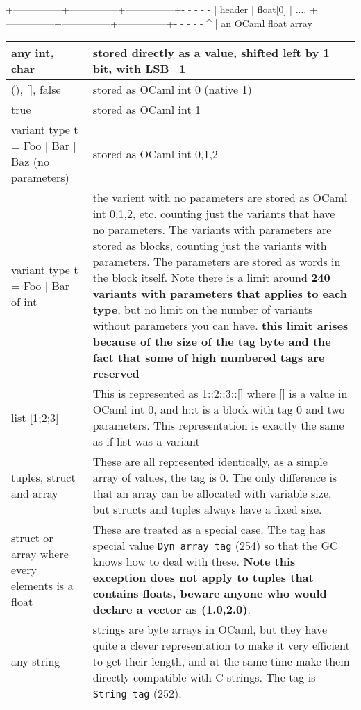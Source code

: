 \begin{enumerate}
\begin{bluetext}
+---------------+---------------+---------------+- - - - -
| header        | float[0]                      | ....
+---------------+---------------+---------------+- - - - -
                  ^
                  |
              an OCaml float array

\end{bluetext}

  \begin{tabular}{|p{3cm}|p{12cm}|}
    \hline 
    any int, char & stored directly as a value, shifted left by 1 bit, with LSB=1\\
    \hline 
    (), [], false & stored as OCaml int 0 (native 1) \\
    \hline 
    true & stored as OCaml int 1 \\
    \hline 
    variant type t = Foo | Bar | Baz
    (no parameters)  & stored as OCaml int 0,1,2 \\
    \hline 
    variant type t = Foo | Bar of int & the varient with no parameters are stored
    as OCaml int 0,1,2, etc. counting just the variants that have no parameters.
    The variants with parameters are stored as blocks, counting just the variants with
    parameters. The parameters are stored as words in the block itself. Note there is
    a limit around {\bf 240 variants with parameters that applies to each type},
    but no limit on the number of variants without parameters you can have. {\bf this limit arises because of the size of the tag byte and the fact that some of high numbered tags are reserved} \\
    \hline 
    list [1;2;3] & This is represented as 1::2::3::[] where [] is a value in OCaml int 0,
    and h::t is a block with tag 0 and two parameters. This representation is exactly
    the same as if list was a variant \\
    \hline 
    tuples, struct and array & These are all represented identically, as a simple
    array of values, the tag is 0. The only difference is that an array can be allocated
    with variable size, but structs and tuples always have a fixed size.
    \\
    \hline
    struct or array where every elements is a float & These are treated as a special case.
    The tag has special value \verb|Dyn_array_tag| (254) so that the GC knows how to deal with
    these. {\bf Note this exception does not apply to tuples that contains floats, beware
      anyone who would declare a vector as (1.0,2.0)}. \\
    \hline
    any string & strings are byte arrays in OCaml, but they have quite a clever representation to make it very efficient to get their length, and at the same time make them directly
    compatible with C strings. The tag is \verb|String_tag| (252).
    \\
    \hline 
  \end{tabular}


\end{enumerate}
